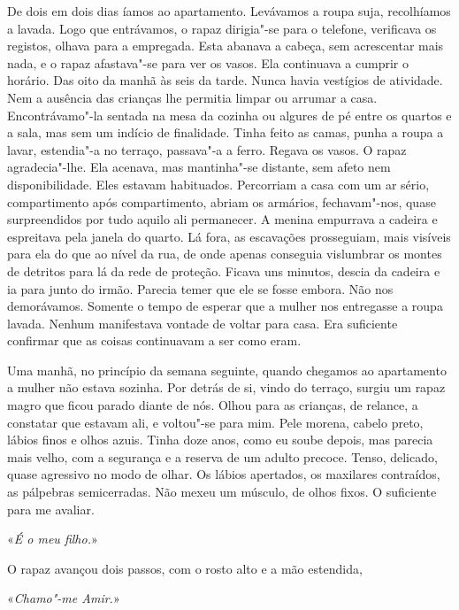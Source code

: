 De dois em dois dias íamos ao apartamento. Levávamos a roupa suja,
recolhíamos a lavada. Logo que entrávamos, o rapaz dirigia"-se para o
telefone, verificava os registos, olhava para a empregada. Esta abanava
a cabeça, sem acrescentar mais nada, e o rapaz afastava"-se para ver os
vasos. Ela continuava a cumprir o horário. Das oito da manhã às seis da
tarde. Nunca havia vestígios de atividade. Nem a ausência das crianças
lhe permitia limpar ou arrumar a casa. Encontrávamo"-la sentada na mesa
da cozinha ou algures de pé entre os quartos e a sala, mas sem um
indício de finalidade. Tinha feito as camas, punha a roupa a lavar,
estendia"-a no terraço, passava"-a a ferro. Regava os vasos. O rapaz
agradecia"-lhe. Ela acenava, mas mantinha"-se distante, sem afeto nem
disponibilidade. Eles estavam habituados. Percorriam a casa com um ar
sério, compartimento após compartimento, abriam os armários,
fechavam"-nos, quase surpreendidos por tudo aquilo ali permanecer. A
menina empurrava a cadeira e espreitava pela janela do quarto. Lá fora,
as escavações prosseguiam, mais visíveis para ela do que ao nível da
rua, de onde apenas conseguia vislumbrar os montes de detritos para lá
da rede de proteção. Ficava uns minutos, descia da cadeira e ia para
junto do irmão. Parecia temer que ele se fosse embora. Não nos
demorávamos. Somente o tempo de esperar que a mulher nos entregasse a
roupa lavada. Nenhum manifestava vontade de voltar para casa. Era
suficiente confirmar que as coisas continuavam a ser como eram.

Uma manhã, no princípio da semana seguinte, quando chegamos ao
apartamento a mulher não estava sozinha. Por detrás de si, vindo do
terraço, surgiu um rapaz magro que ficou parado diante de nós. Olhou
para as crianças, de relance, a constatar que estavam ali, e voltou"-se
para mim. Pele morena, cabelo preto, lábios finos e olhos azuis. Tinha
doze anos, como eu soube depois, mas parecia mais velho, com a segurança
e a reserva de um adulto precoce. Tenso, delicado, quase agressivo no
modo de olhar. Os lábios apertados, os maxilares contraídos, as
pálpebras semicerradas. Não mexeu um músculo, de olhos fixos. O
suficiente para me avaliar.

«\emph{É o meu filho.}»

O rapaz avançou dois passos, com o rosto alto e a mão estendida,

«\emph{Chamo"-me Amir.}»

